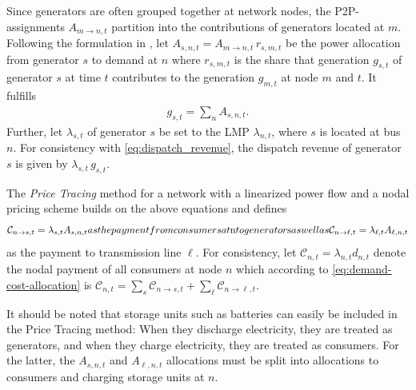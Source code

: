 \documentclass[11pt,twocolumn]{article}
\newcommand{\generation}{g_{s,t}}
\newcommand{\nodalgeneration}[1][n]{g_{#1,t}}
\newcommand{\lmp}[1][n]{\lambda_{#1,t}}
\newcommand{\demand}[1][n]{d_{#1,t}}
\newcommand{\cost}{\mathcal{C}}
\newcommand{\payment}[1][n]{\cost_{#1,t}}
\newcommand{\allocategeneration}[1][s, n]{A_{#1,t}}
\newcommand{\allocatepeer}[1][m \rightarrow n]{A_{#1,t}}
\newcommand{\allocateflow}[1][n]{A_{\ell,#1,t}}
\newcommand{\allocategeneratorcost}[1][n \rightarrow s]{\cost_{#1, t}}
\newcommand{\allocatelinecost}[1][n \rightarrow \ell]{\cost_{#1, t}}
\begin{document}
Since generators are often grouped together at network nodes, the \ac{P2P}-assignments $\allocatepeer$ partition into the contributions of generators located at $m$. Following the formulation in \cite{schafer_tracing_2020}, let $\allocategeneration = \allocatepeer \, r_{s,m,t}$ be the power allocation from generator $s$ to demand at $n$ where $r_{s,m,t}$ is the share that generation $\generation$ of generator $s$ at time $t$ contributes to the generation $\nodalgeneration[m]$ at node $m$ and $t$. It fulfills
\begin{align}
    \generation = \sum_n \allocategeneration .
    \label{eq:generation-breakdown}
\end{align}
Further, let $\lmp[s]$ of generator $s$ be set to the \ac{LMP} $\lmp$, where $s$ is located at bus $n$. For consistency with \cref{eq:dispatch_revenue}, the dispatch revenue of generator $s$ is given by $\lmp[s] \, \generation$.\


The \textit{Price Tracing} method for a network with a linearized power flow and a nodal pricing scheme builds on the above equations and defines
\begin{subequations}
    \begin{align}
        \allocategeneratorcost = \lmp[s] \allocategeneration
    \end{align}
    as the payment from consumers at $n$ to generator $s$ as well as
    \begin{align}
        \allocatelinecost = \lmp[\ell] \allocateflow
    \end{align}
\end{subequations}
as the payment to transmission line $\ell$. For consistency, let $\payment = \lmp \demand$ denote the nodal payment of all consumers at node $n$ which according to \cref{eq:demand-cost-allocation} is $\payment = \sum_s \allocategeneratorcost + \sum_\ell \allocatelinecost$.

It should be noted that storage units such as batteries can easily be included in the Price Tracing method: When they discharge electricity, they are treated as generators, and when they charge electricity, they are treated as consumers. For the latter, the $\allocategeneration$ and $\allocateflow$ allocations must be split into allocations to consumers and charging storage units at $n$.

\end{document}
